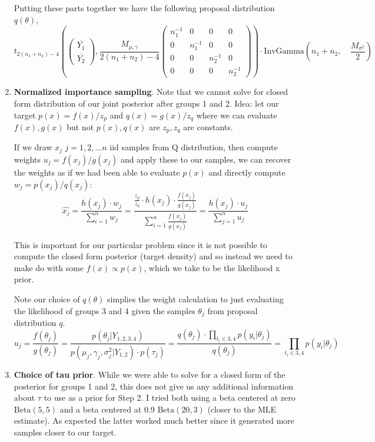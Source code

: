 \documentclass[12pt,letterpaper,twoside]{article}
\begin{document}
\begin{enumerate}[label=(\alph*)]
    Putting these parts together we have the following proposal distribution $q(\theta)$,
    $$ t_{2(n_1 + n_2) - 4}\left(\left(\begin{matrix*}
        \overline{Y_1}\\ \overline{Y_2} \end{matrix*}\right), \frac{M_{\mu, \gamma}}{2(n_1 + n_2) - 4}\left(\begin{matrix*}
        n_1^{-1} & 0 & 0 & 0 \\ 0 & n_1^{-1} & 0 & 0 \\ 0 & 0 & n_2^{-1} & 0 \\ 0 & 0 & 0 & n_2^{-1}
        \end{matrix*}\right)\right) \cdot \text{InvGamma}\left(n_1+n_2, \quad \frac{M_{\sigma^2}}{2} \right) $$

    \item \textbf{Normalized importance sampling}. Note that we cannot solve 
    for closed form distribution of our joint posterior after groups 1 and 2. 
    Idea: let our target $p(x) = f(x) / z_p$ and $q(x) = g(x) / z_q$ where 
    we can evaluate $f(x), g(x)$ but not $p(x), q(x)$ are $z_p, z_q$ are 
    constants. \newline

    If we draw $x_j$ $j=1,2,...n$ iid samples from Q distribution, then compute 
    weights $u_j = f(x_j) / g(x_j)$ and apply these to our samples, we can 
    recover the weights as if we had been able to evaluate $p(x)$ and 
    directly compute $w_j = p(x_j) / q(x_j)$:
    $$ \hat{x_j} = \frac{h(x_j) \cdot w_j}{\sum_{i=1}^n w_j} = \frac{\frac{z_p}{z_q} \cdot h(x_j) \cdot \frac{f(x_j)}{g(x_j)}}{\sum_{i=1}^n \frac{f(x_j)}{g(x_j)}} = \frac{h(x_j) \cdot u_j}{\sum_{j=1}^n u_j}$$

    This is important for our particular problem since it is not possible 
    to compute the closed form posterior (target density) and so instead 
    we need to make do with some $f(x) \propto p(x)$, which we take to be
    the likelihood x prior. \newline
    
    Note our choice of $q(\theta)$  simplies the weight calculation to just
    evaluating the likelihood of groups 3 and 4 given the samples $\theta_j$ 
    from proposal distribution $q$.
    $$ u_j = \frac{f(\theta_j)}{g(\theta_j)} = \frac{p(\theta_j|Y_{1,2,3,4})}{p(\mu_j, \gamma_j, \sigma_j^2|Y_{1,2}) \cdot p(\tau_j)} = \frac{q(\theta_j) \cdot \prod_{t_i\in{3,4}} p(y_i|\theta_j)}{q(\theta_j)} = \prod_{t_i\in{3,4}} p(y_i|\theta_j) $$

    \item \textbf{Choice of tau prior}. While we were able to solve for a 
    closed form of the posterior for groups 1 and 2, this does not give us 
    any additional information about $\tau$ to use as a prior for Step 2. 
    I tried both using a beta centered at zero $\text{Beta}(5, 5)$ and a 
    beta centered at 0.9 $\text{Beta}(20, 3)$ (closer to the MLE estimate).
    As expected the latter worked much better since it generated more 
    samples closer to our target.

\end{enumerate}
\end{document}
